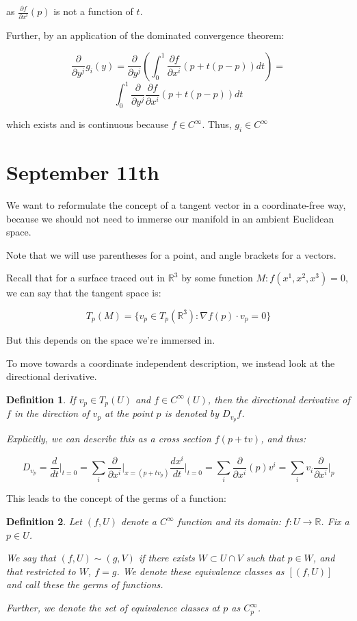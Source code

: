 \documentclass[10pt]{article}
\newtheorem{definition}{Definition}[section]
\begin{document}
as $ \frac{\partial f}{\partial x^i}(p)$ is not a function of $t$.

Further, by an application of the dominated convergence theorem:

$$ \frac{\partial}{\partial y^j} g_i(y) = \frac{\partial}{\partial y^j} \left( \int_0^1 \frac{\partial f}{\partial x^i} (p + t(p-p))dt\right) = $$
$$ \int_0^1 \frac{\partial}{\partial y^j} \frac{\partial f}{\partial x^i} (p + t(p-p))dt $$

which exists and is continuous because $f \in C^\infty$. Thus, $g_i \in C^\infty$

\section{September 11th}

We want to reformulate the concept of a tangent vector in a coordinate-free way, because we should not need to immerse our manifold in an ambient Euclidean space.

Note that we will use parentheses for a point, and angle brackets for a vectors.

Recall that for a surface traced out in $\mathbb{R}^3$ by some function $M: f(x^1, x^2, x^3) = 0$, we can say that the tangent space is:

$$ T_p(M)  = \{ v_p \in T_p(\mathbb{R}^3) : \nabla f(p) \cdot v_p = 0 \} $$

But this depends on the space we’re immersed in.

To move towards a coordinate independent description, we instead look at the directional derivative.

\begin{definition}
If $v_p \in T_p(U)$ and $f \in C^\infty(U)$, then the directional derivative of $f$ in the direction of $v_p$ at the point $p$ is denoted by $D_{v_p} f$.

Explicitly, we can describe this as a cross section $f(p + tv)$, and thus:

$$ D_{v_p} = \frac{d}{dt} \bigg|_{t=0} = \sum_i \frac{\partial }{\partial x^i}\bigg|_{x = (p + tv_p)} \frac{dx^i}{dt} \bigg|_{t=0} = \sum_i \frac{\partial }{\partial x^i}(p) v^i= \sum_i v_i \frac{\partial}{\partial x^i} \bigg|_{p}  $$ 
\end{definition}

This leads to the concept of the germs of a function:

\begin{definition}
Let $(f, U)$ denote a $C^\infty$ function and its domain: $f: U \to \mathbb{R}$. Fix a $p \in U$.

We say that $(f, U) \sim (g, V)$ if there exists $W \subset U \cap V$ such that $p \in W$, and that restricted to $W$, $f = g$. We denote these equivalence classes as $[(f,U)]$ and call these the germs of functions.

Further, we denote the set of equivalence classes at $p$ as $C_p^\infty$.

\end{definition}
\end{document}
